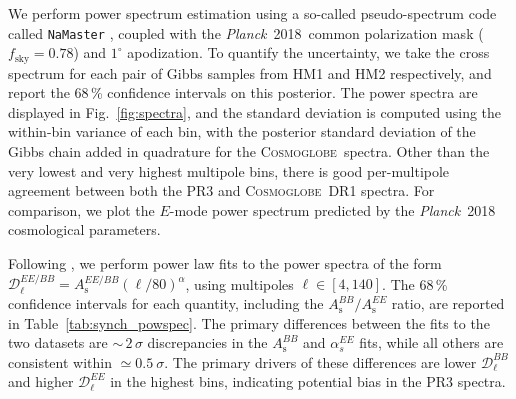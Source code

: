 \documentclass[twocolumn]{../../common/aa}
\def\Planck{\emph{Planck}}
\newcommand{\cosmoglobe}{\textsc{Cosmoglobe}}
\begin{document}

We perform power spectrum estimation using a so-called pseudo-spectrum code called \texttt{NaMaster} \citep{namaster}, coupled with the \Planck\ 2018\ common polarization mask ($f_\mathrm{sky}=0.78$) and $1^\circ$ apodization.
To quantify the uncertainty, we take the cross spectrum for each pair of Gibbs samples from HM1 and HM2 respectively, and report the 68\,\% confidence intervals on this posterior. The power spectra are displayed in Fig.~\ref{fig:spectra}, and the standard deviation is computed using the within-bin variance of each bin, with the posterior standard deviation of the Gibbs chain added in quadrature for the \cosmoglobe\ spectra.
Other than the very lowest and very highest multipole bins, there is good per-multipole agreement between both the PR3 and \cosmoglobe\ DR1 spectra. For comparison, we plot the $E$-mode power spectrum predicted by the \Planck\ 2018 cosmological parameters.

Following \citet{planck2016-l04}, we perform power law fits to the power spectra of the form ${\mathcal D_\ell^{EE/BB}=A_{\mathrm{s}}^{{EE/BB}}(\ell/80)^\alpha}$, using multipoles $\ell\in[4,140]$. The 68\,\% confidence intervals for each quantity, including the $A_{\mathrm{s}}^{BB}/A_{\mathrm{s}}^{EE}$ ratio, are reported in Table~\ref{tab:synch_powspec}. The primary differences between the fits to the two datasets are $\sim$\,$2\,\sigma$ discrepancies in the $A_{\mathrm{s}}^{BB}$ and $\alpha_s^{EE}$ fits, while all others are consistent within $\simeq0.5~\sigma$. The primary drivers of these differences are lower $\mathcal D_\ell^{BB}$ and higher $\mathcal D_\ell^{EE}$ in the highest bins, indicating potential bias in the PR3 spectra.
\end{document}
